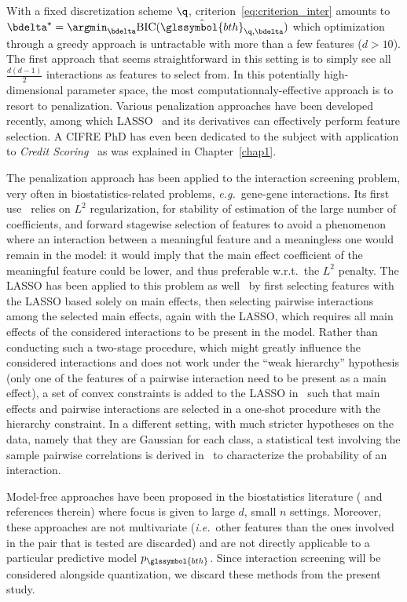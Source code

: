 With a fixed discretization scheme $\q$, criterion~\ref{eq:criterion_inter} amounts to $\bdelta^\star = \argmin_{\bdelta} \text{BIC}(\hat{\glssymbol{bth}}_{\q,\bdelta})$ which optimization through a greedy approach is untractable with more than a few features ($d > 10$). The first approach that seems straightforward in this setting is to simply see all $\frac{d(d-1)}{2}$ interactions as features to select from. In this potentially high-dimensional parameter space, the most computationnaly-effective approach is to resort to penalization. Various penalization approaches have been developed recently, among which LASSO~\cite{tibshirani1996regression} and its derivatives can effectively perform feature selection. A CIFRE PhD has even been dedicated to the subject with application to \textit{Credit Scoring}~\cite{vital2016} as was explained in Chapter~\ref{chap1}.

The penalization approach has been applied to the interaction screening problem, very often in biostatistics-related problems, \textit{e.g.}\ gene-gene interactions. Its first use~\cite{park2007penalized} relies on $L^2$ regularization, for stability of estimation of the large number of coefficients, and forward stagewise selection of features to avoid a phenomenon where an interaction between a meaningful feature and a meaningless one would remain in the model: it would imply that the main effect coefficient of the meaningful feature could be lower, and thus preferable w.r.t.\ the $L^2$ penalty. The LASSO has been applied to this problem as well~\cite{wu2009genome} by first selecting features with the LASSO based solely on main effects, then selecting pairwise interactions among the selected main effects, again with the LASSO, which requires all main effects of the considered interactions to be present in the model. Rather than conducting such a two-stage procedure, which might greatly influence the considered interactions and does not work under the ``weak hierarchy'' hypothesis (only one of the features of a pairwise interaction need to be present as a main effect), a set of convex constraints is added to the LASSO in~\cite{bien2013lasso} such that main effects and pairwise interactions are selected in a one-shot procedure with the hierarchy constraint. In a different setting, with much stricter hypotheses on the data, namely that they are Gaussian for each class, a statistical test involving the sample pairwise correlations is derived in~\cite{simon} to characterize the probability of an interaction.

Model-free approaches have been proposed in the biostatistics literature (\cite{yang2008snpharvester,zhang2010team,li2013model,dong2008exploration,zhang2007bayesian,wan2010boost} and references therein) where focus is given to large $d$, small $n$ settings. Moreover, these approaches are not multivariate (\textit{i.e.}\ other features than the ones involved in the pair that is tested are discarded) and are not directly applicable to a particular predictive model $p_{\glssymbol{bth}}$. Since interaction screening will be considered alongside quantization, we discard these methods from the present study.


